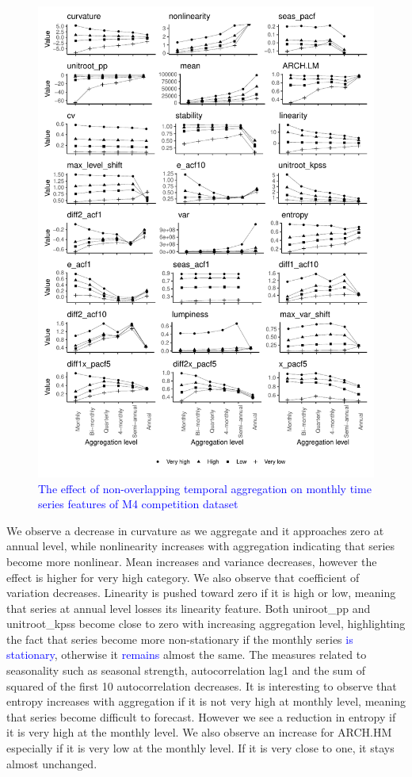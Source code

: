 \documentclass[preprint, 3p,
authoryear]{elsarticle} %
\begin{document}
\begin{figure}[H]

{\centering \includegraphics[width=0.7\linewidth]{img/mp_category_all1} 

}

\caption{ \textcolor{blue}{The effect of non-overlapping temporal aggregation on monthly time series features of M4 competition dataset} }\label{fig:featureagg1}
\end{figure}

We observe a decrease in curvature as we aggregate and it approaches
zero at annual level, while nonlinearity increases with aggregation
indicating that series become more nonlinear. Mean increases and
variance decreases, however the effect is higher for very high category.
We also observe that coefficient of variation decreases. Linearity is
pushed toward zero if it is high or low, meaning that series at annual
level losses its linearity feature. Both uniroot\_pp and unitroot\_kpss
become close to zero with increasing aggregation level, highlighting the
fact that series become more non-stationary if the monthly series
\textcolor{blue}{is stationary}, otherwise it \textcolor{blue}{remains}
almost the same. The measures related to seasonality such as seasonal
strength, autocorrelation lag1 and the sum of squared of the first 10
autocorrelation decreases. It is interesting to observe that entropy
increases with aggregation if it is not very high at monthly level,
meaning that series become difficult to forecast. However we see a
reduction in entropy if it is very high at the monthly level. We also
observe an increase for ARCH.HM especially if it is very low at the
monthly level. If it is very close to one, it stays almost unchanged.
\end{document}
